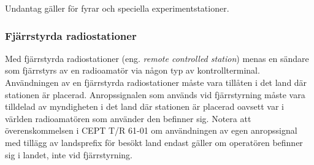 Undantag gäller för fyrar och speciella experimentstationer.

\subsubsection{Fjärrstyrda radiostationer}

Med fjärrstyrda radiostationer (eng. \emph{remote controlled station}) menas en
sändare som fjärrstyrs av en radioamatör via någon typ av kontrollterminal.
Användningen av en fjärrstyrda radiostationer måste vara tillåten i det land där
stationen är placerad.
Anropssignalen som används vid fjärrstyrning måste vara tilldelad av myndigheten
i det land där stationen är placerad oavsett var i världen radioamatören som
använder den befinner sig.
Notera att överenskommelsen i CEPT T/R 61-01 \cite{TR6101} om användningen av
egen anropssignal med tillägg av landsprefix för besökt land endast gäller om
operatören befinner sig i landet, inte vid fjärrstyrning.

\twocolumn
